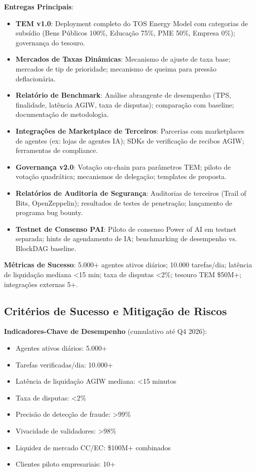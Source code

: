 \documentclass[11pt]{article}
\begin{document}
\begin{itemize}[noitemsep]
\begin{itemize}[noitemsep]
\begin{itemize}[noitemsep]
\textbf{Entregas Principais}:
\begin{itemize}[noitemsep]
  \item \textbf{TEM v1.0}: Deployment completo do TOS Energy Model com categorias de subsídio (Bens Públicos 100\%, Educação 75\%, PME 50\%, Empresa 0\%); governança do tesouro.
  \item \textbf{Mercados de Taxas Dinâmicas}: Mecanismo de ajuste de taxa base; mercados de tip de prioridade; mecanismo de queima para pressão deflacionária.
  \item \textbf{Relatório de Benchmark}: Análise abrangente de desempenho (TPS, finalidade, latência AGIW, taxa de disputas); comparação com baseline; documentação de metodologia.
  \item \textbf{Integrações de Marketplace de Terceiros}: Parcerias com marketplaces de agentes (ex: lojas de agentes IA); SDKs de verificação de recibos AGIW; ferramentas de compliance.
  \item \textbf{Governança v2.0}: Votação on-chain para parâmetros TEM; piloto de votação quadrática; mecanismos de delegação; templates de proposta.
  \item \textbf{Relatórios de Auditoria de Segurança}: Auditorias de terceiros (Trail of Bits, OpenZeppelin); resultados de testes de penetração; lançamento de programa bug bounty.
  \item \textbf{Testnet de Consenso PAI}: Piloto de consenso Power of AI em testnet separada; hints de agendamento de IA; benchmarking de desempenho vs. BlockDAG baseline.
\end{itemize}

\textbf{Métricas de Sucesso}: 5.000+ agentes ativos diários; 10.000 tarefas/dia; latência de liquidação mediana <15 min; taxa de disputas <2\%; tesouro TEM \$50M+; integrações externas 5+.

\subsection{Critérios de Sucesso e Mitigação de Riscos}

\textbf{Indicadores-Chave de Desempenho} (cumulativo até Q4 2026):
\begin{itemize}[noitemsep]
  \item Agentes ativos diários: 5.000+
  \item Tarefas verificadas/dia: 10.000+
  \item Latência de liquidação AGIW mediana: <15 minutos
  \item Taxa de disputas: <2\%
  \item Precisão de detecção de fraude: >99\%
  \item Vivacidade de validadores: >98\%
  \item Liquidez de mercado CC/EC: \$100M+ combinados
  \item Clientes piloto empresariais: 10+
\end{itemize}


\end{itemize}
\end{itemize}
\end{itemize}
\end{document}
